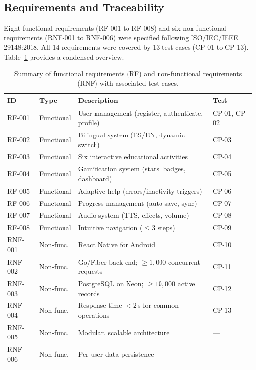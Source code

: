 \documentclass[preprint,12pt]{elsarticle}
\begin{document}
        \subsection{Requirements and Traceability}
            Eight functional requirements (RF-001 to RF-008) and six non-functional requirements (RNF-001 to RNF-006) were specified following ISO/IEC/IEEE 29148:2018. All 14 requirements were covered by 13 test cases (CP-01 to CP-13). Table~\ref{tab:requirements} provides a condensed overview.
            \begin{table}[t]
                \centering
                \small\caption{Summary of functional requirements (RF) and non-functional requirements (RNF) with associated test cases.}
                \label{tab:requirements}
                \footnotesize
                \begin{tabular}{@{}p{1.4cm}p{1.8cm}p{6.5cm}p{1.5cm}@{}}
                    \toprule
                    \textbf{ID} & \textbf{Type} & \textbf{Description} & \textbf{Test} \\
                    \midrule
                    RF-001 & Functional & User management (register, authenticate, profile) & CP-01, CP-02 \\
                    RF-002 & Functional & Bilingual system (ES/EN, dynamic switch) & CP-03 \\
                    RF-003 & Functional & Six interactive educational activities & CP-04 \\
                    RF-004 & Functional & Gamification system (stars, badges, dashboard) & CP-05 \\
                    RF-005 & Functional & Adaptive help (errors/inactivity triggers) & CP-06 \\
                    RF-006 & Functional & Progress management (auto-save, sync) & CP-07 \\
                    RF-007 & Functional & Audio system (TTS, effects, volume) & CP-08 \\
                    RF-008 & Functional & Intuitive navigation ($\leq 3$ steps) & CP-09 \\
                    RNF-001 & Non-func. & React Native for Android & CP-10 \\
                    RNF-002 & Non-func. & Go/Fiber back-end; $\geq 1{,}000$ concurrent requests & CP-11 \\
                    RNF-003 & Non-func. & PostgreSQL on Neon; $\geq 10{,}000$ active records & CP-12 \\
                    RNF-004 & Non-func. & Response time $<2$\,s for common operations & CP-13 \\
                    RNF-005 & Non-func. & Modular, scalable architecture & --- \\
                    RNF-006 & Non-func. & Per-user data persistence & --- \\
                    \bottomrule
                \end{tabular}
            \end{table}
\end{document}
